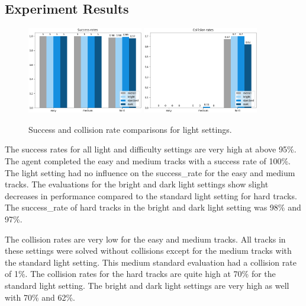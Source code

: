 \subsection{Experiment Results}

\begin{figure}
    \centering
    \includegraphics[width=0.45\textwidth]{Bilder/notebook_images/hardDistanceMixedLight_eval_all_success_rates_barplot.png}
    \includegraphics[width=0.45\textwidth]{Bilder/notebook_images/hardDistanceMixedLight_eval_all_collision_rates_barplot.png}
    \caption{Success and collision rate comparisons for light settings.}
    \label{fig:result_success_rates_lightSettings}
\end{figure}

The success rates for all light and difficulty settings are very high at above 95\%. The agent completed the easy and medium tracks with a success rate of 100\%. The light setting had no influence on the success\_rate for the easy and medium tracks.
The evaluations for the bright and dark light settings show slight decreases in performance compared to the standard light setting for hard tracks. The success\_rate of hard tracks in the bright and dark light setting was 98\% and 97\%.

The collision rates are very low for the easy and medium tracks. All tracks in these settings were solved without collisions except for the medium tracks with the standard light setting. This medium standard evaluation had a collision rate of 1\%.
The collision rates for the hard tracks are quite high at 70\% for the standard light setting. The bright and dark light settings are very high as well with 70\% and 62\%.

